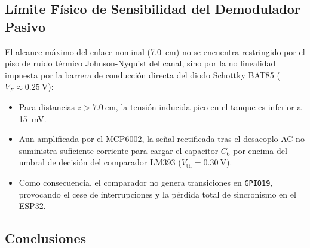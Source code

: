 \subsection{Límite Físico de Sensibilidad del Demodulador Pasivo}
\label{subsec:limite_sensibilidad}

El alcance máximo del enlace nominal (\SI{7.0}{\centi\meter}) no se encuentra restringido por el piso de ruido térmico Johnson-Nyquist del canal, sino por la no linealidad impuesta por la barrera de conducción directa del diodo Schottky BAT85 ($V_F \approx \SI{0.25}{\volt}$):
\begin{itemize}
    \item Para distancias $z > \SI{7.0}{\centi\meter}$, la tensión inducida pico en el tanque es inferior a \SI{15}{\milli\volt}.
    \item Aun amplificada por el MCP6002, la señal rectificada tras el desacoplo AC no suministra suficiente corriente para cargar el capacitor $C_6$ por encima del umbral de decisión del comparador LM393 ($V_{\text{th}} = \SI{0.30}{\volt}$).
    \item Como consecuencia, el comparador no genera transiciones en \texttt{GPIO19}, provocando el cese de interrupciones y la pérdida total de sincronismo en el ESP32.
\end{itemize}

\subsection{Conclusiones}
\label{subsec:conclusiones}

